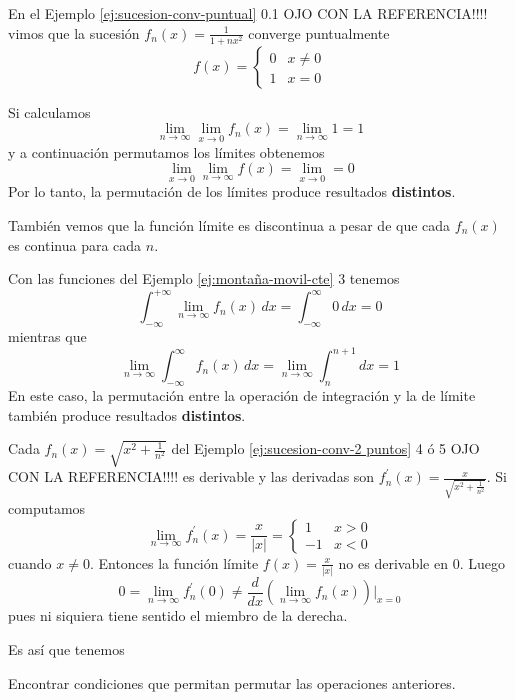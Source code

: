 \begin{ejemplo}{}
En el Ejemplo \ref{ej:sucesion-conv-puntual} 0.1 OJO CON LA REFERENCIA!!!!
vimos que  la sucesión 
$f_n(x)=\frac{1}{1+nx^2}$ converge puntualmente 
\[f(x)=\left\{\begin{array}{ll}
0&x\neq 0
\\
1&x=0
\end{array}
\right.\]

Si calculamos 
\[
\lim\limits_{n\to \infty}\lim\limits_{x \to 0}f_n(x)=\lim\limits_{n \to \infty}1=1
\]
y a continuación permutamos los límites obtenemos
\[
\lim\limits_{x\to 0}\lim\limits_{n \to \infty}f (x)=\lim\limits_{x \to 0}=0
\]
Por lo tanto, la permutación de los límites produce resultados \textbf{distintos}.

También vemos que la función límite es discontinua a pesar de que cada $f_n(x)$ es continua para cada $n$.
\end{ejemplo}

\begin{ejemplo}{}
Con las funciones del Ejemplo \ref{ej:montaña-movil-cte} 3 tenemos
\[
\int_{-\infty}^{+\infty} \lim\limits_{n \to  \infty} f_n(x)\,dx=\int_{-\infty}^{\infty} 0\,dx=0
\]
mientras que 
\[
\lim\limits_{n \to \infty} \int_{-\infty}^{\infty} f_n(x)\,dx=\lim\limits_{n \to \infty} \int_{n}^{n+1}dx=1
\]
En este caso, la permutación entre la operación de integración y la de límite también produce resultados \textbf{distintos}.
\end{ejemplo}

\begin{ejemplo}{}
Cada $f_n(x)=\sqrt{x^2+\frac{1}{n^2}}$ del Ejemplo \ref{ej:sucesion-conv-2 puntos} 4 ó 5 OJO CON LA REFERENCIA!!!!
es derivable y las derivadas son
$f_n^{'}(x)=\frac{x}{\sqrt{x^2+\frac{1}{n^2}}}$. 
Si computamos
\[
\lim\limits_{n \to \infty} f_n^{'}(x)=\frac{x}{|x|}=
\left\{
\begin{array}{ll}
1&x>0
\\
-1&x<0
\end{array}
\right.\]
cuando $x\neq 0$.
Entonces la funci\'on límite $f(x)=\frac{x}{|x|}$ no es derivable en 0. Luego  
\[
0=\lim\limits_{n \to \infty}f_n^{'}(0)\neq \frac{d}{dx}\left(\lim\limits_{n \to \infty}f_n(x)\right)\left. \right|_{x=0}
\]
pues ni siquiera tiene sentido el miembro de la derecha.
\end{ejemplo}

Es así que tenemos  
\begin{mdframed}[style=MiEstilo]\relax%
Encontrar condiciones que permitan permutar las operaciones anteriores.
\end{mdframed}



